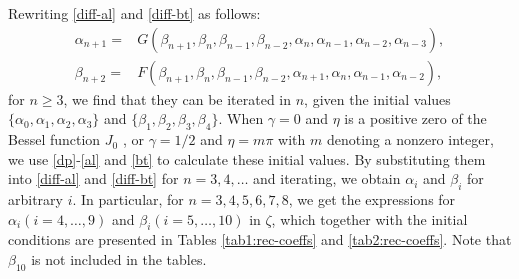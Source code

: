 \documentclass[11pt,a4paper]{article}
\numberwithin{equation}{section}
\begin{document}
Rewriting \eqref{diff-al} and \eqref{diff-bt} as follows:
\begin{align*}
\alpha_{n+1}=&G\left(\beta_{n+1},\beta_{n}, \beta_{n-1}, \beta_{n-2}, \alpha_{n},\alpha_{n-1}, \alpha_{n-2}, \alpha_{n-3}\right),\\
\beta_{n+2}=&F\left(\beta_{n+1},\beta_{n},\beta_{n-1},\beta_{n-2}, \alpha_{n+1},\alpha_{n},\alpha_{n-1},\alpha_{n-2}\right), \end{align*}
for $n\geq3$, we find that they can be iterated in $n$, given the initial values $\{\alpha_0,\alpha_1,\alpha_2,\alpha_3\}$ and $\{ \beta_1,\beta_2,\beta_3,\beta_4\}$. When $\gamma=0$ and $\eta$ is a positive zero of the Bessel function $J_0$ , or $\gamma=1/2$ and $\eta=m\pi$ with $m$ denoting a nonzero integer, we use \eqref{dp}-\eqref{al} and \eqref{bt} to calculate these initial values. By substituting them into \eqref{diff-al} and \eqref{diff-bt} for $n=3,4,\dots$ and iterating, we obtain $\alpha_{i}$ and $\beta_i$ for arbitrary $i$. In particular, for $n=3,4,5,6,7,8$, we get the expressions for $\alpha_i (i=4,\dots,9)$ and $\beta_i (i=5,\dots,10)$ in $\zeta$, which together with the initial conditions are presented in Tables \ref{tab1:rec-coeffs} and \ref{tab2:rec-coeffs}. Note that $\beta_{10}$ is not included in the tables.
\end{document}
